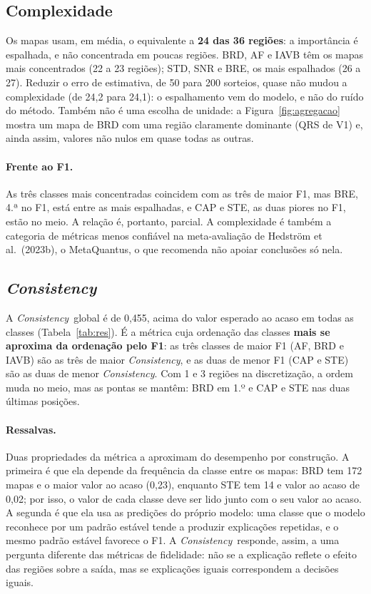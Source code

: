 \documentclass[11pt,a4paper]{article}
\newcommand{\CS}{\textit{Consistency}}
\begin{document}
\subsection{Complexidade}\label{sec:res-complexidade}
Os mapas usam, em média, o equivalente a \textbf{24 das 36 regiões}: a importância é espalhada, e não concentrada em poucas regiões. BRD, AF e IAVB têm os mapas mais concentrados (22 a 23 regiões); STD, SNR e BRE, os mais espalhados (26 a 27). Reduzir o erro de estimativa, de 50 para 200 sorteios, quase não mudou a complexidade (de 24,2 para 24,1): o espalhamento vem do modelo, e não do ruído do método. Também não é uma escolha de unidade: a Figura~\ref{fig:agregacao} mostra um mapa de BRD com uma região claramente dominante (QRS de V1) e, ainda assim, valores não nulos em quase todas as outras.

\paragraph{Frente ao F1.} As três classes mais concentradas coincidem com as três de maior F1, mas BRE, 4.ª no F1, está entre as mais espalhadas, e CAP e STE, as duas piores no F1, estão no meio. A relação é, portanto, parcial. A complexidade é também a categoria de métricas menos confiável na meta-avaliação de Hedström et al.\ (2023b), o MetaQuantus, o que recomenda não apoiar conclusões só nela.

\subsection{\CS}\label{sec:res-consistency}
A \CS\ global é de 0,455, acima do valor esperado ao acaso em todas as classes (Tabela~\ref{tab:res}). É a métrica cuja ordenação das classes \textbf{mais se aproxima da ordenação pelo F1}: as três classes de maior F1 (AF, BRD e IAVB) são as três de maior \CS, e as duas de menor F1 (CAP e STE) são as duas de menor \CS. Com 1 e 3 regiões na discretização, a ordem muda no meio, mas as pontas se mantêm: BRD em 1.º e CAP e STE nas duas últimas posições.

\paragraph{Ressalvas.} Duas propriedades da métrica a aproximam do desempenho por construção. A primeira é que ela depende da frequência da classe entre os mapas: BRD tem 172 mapas e o maior valor ao acaso (0,23), enquanto STE tem 14 e valor ao acaso de 0,02; por isso, o valor de cada classe deve ser lido junto com o seu valor ao acaso. A segunda é que ela usa as predições do próprio modelo: uma classe que o modelo reconhece por um padrão estável tende a produzir explicações repetidas, e o mesmo padrão estável favorece o F1. A \CS\ responde, assim, a uma pergunta diferente das métricas de fidelidade: não se a explicação reflete o efeito das regiões sobre a saída, mas se explicações iguais correspondem a decisões iguais.
\end{document}
